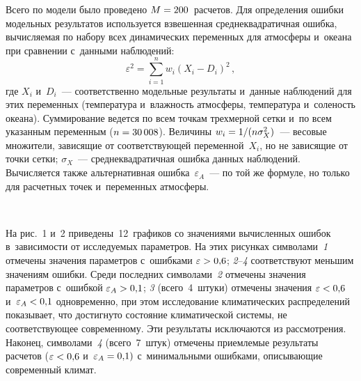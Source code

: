 \begin{multicols}{2}
  
  Всего по модели было проведено $M\hm= 200$~расче\-тов. Для определения 
ошибки модельных результа\-тов используется взвешенная среднеквадратичная 
ошибка, вычисляемая по набору всех динамических переменных для 
атмосферы и~океана при сравнении с~данными наблюдений:
  $$
  \varepsilon^2 =\sum\limits_{i=1}^n w_i \left( X_i-D_i\right)^2\,,
  $$
где $X_i$ и~$D_i$~--- соответственно модельные результаты и~данные 
наблюдений для этих переменных (температура и~влажность атмосферы, 
температура и~соленость океана). Суммирование ведется по всем точкам 
трехмерной сетки и~по всем указанным переменным ($n\hm=30\,008$). 
Величины  $w_i\hm= 1/(n\sigma^2_X)$~--- весовые множители, зависящие от 
со\-от\-вет\-ст\-ву\-ющей переменной~$X_i$, но не зависящие от точки сетки; 
 $\sigma_X$~--- среднеквадратичная ошибка данных наблюдений. Вычисляется 
также альтернативная ошибка~$\varepsilon_A$~--- по той же формуле, но только 
для расчетных точек и~переменных атмосферы.

 \begin{figure*} %
  \vspace*{1pt}
\begin{center}
\mbox{%
\epsfxsize=159.825mm
}
\end{center}
\vspace*{-9pt}
\end{figure*}
   
  
  На рис.~1 и~2 приведены~12~графиков со значениями вычисленных ошибок 
в~зависимости от исследуемых параметров. На этих рисунках символами~\textit{1} 
отмечены значения параметров с~ошибками $\varepsilon\hm>0{,}6$; 
\textit{2}--\textit{4} соответствуют меньшим значениям ошибки. Среди 
последних символами~\textit{2} отмечены значения параметров с~ошибкой 
$\varepsilon_A\hm> 0{,}1$; \textit{3} (всего~4~штуки) отмечены 
значения $\varepsilon\hm< 0{,}6$ и~$\varepsilon_A\hm< 0{,}1$ одновременно, 
при этом исследование климатических распределений показывает, что 
достигнуто состо\-яние климатической системы, не соответствующее 
современному. Эти результаты исключаются из рассмотрения. Наконец, 
символами~\textit{4} (всего~7~штук) отмечены приемлемые 
результаты расчетов ($\varepsilon\hm< 0{,}6$ и~$\varepsilon_A\hm= 0{,}1)$ 
с~минимальными ошибками, описывающие современный климат. 


\end{multicols}
